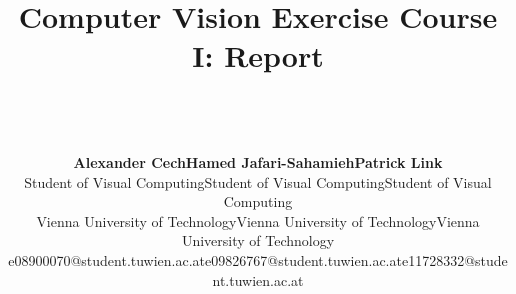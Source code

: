 \documentclass[a4paper,psfig,subfigure,epsfig,fleqn,ausarbeitung,amssmb,float,caption,fontenc]{article}
\begin{document}
\date{}

\title{%
  \fontsize{14}{14pt} \bf Computer Vision Exercise Course I: Report}

\author{~\\
  ~\\
  \fontsize{12}{12pt}
  \begin{tabular}[t]{c c c}
  {\bf Alexander Cech}                    & {\bf Hamed Jafari-Sahamieh}             & {\bf Patrick Link}                      \\
  \small{Student of Visual Computing}     & \small{Student of Visual Computing}     & \small{Student of Visual Computing}     \\
  \small{Vienna University of Technology} & \small{Vienna University of Technology} & \small{Vienna University of Technology} \\
  \small{e08900070@student.tuwien.ac.at}  & \small{e09826767@student.tuwien.ac.at}  & \small{e11728332@student.tuwien.ac.at}  \\
  \end{tabular}
  ~\\ 
  \normalsize
  \normalsize
  }

\maketitle

\normalfont
\thispagestyle{empty}
\end{document}
